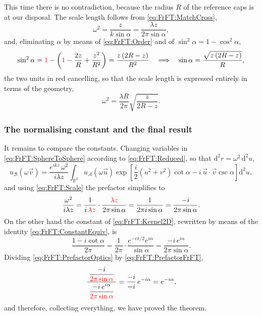 			This time there is no contradiction, because the radius $R$ of the reference caps is at our disposal. The scale length follows from \eqref{eq:FrFT:MatchCross},
			\begin{equation}\label{eq:FrFT:Scale}
				\omega^{2} = \frac{z}{k\sin\alpha} = \frac{\lambda z}{2\pi\sin\alpha},
			\end{equation}
			and, eliminating $\alpha$ by means of \eqref{eq:FrFT:Order} and of $\sin^{2}\alpha = 1-\cos^{2}\alpha$,
			\begin{equation*}
				\sin^{2}\alpha = {\color{red}1} - \left({\color{red}1} - \frac{2z}{R} + \frac{z^{2}}{R^{2}}\right) = \frac{z\left(2R-z\right)}{R^{2}} \quad\Longrightarrow\quad \sin\alpha = \frac{\sqrt{z\left(2R-z\right)}}{R},
			\end{equation*}
			the two units in red cancelling, so that the scale length is expressed entirely in terms of the geometry,
			\begin{equation}\label{eq:FrFT:ScaleExplicit}
				\omega^{2} = \frac{\lambda R}{2\pi}\sqrt{\frac{z}{2R-z}}.
			\end{equation}

		\subsubsection{The normalising constant and the final result}

			It remains to compare the constants. Changing variables in \eqref{eq:FrFT:SphereToSphere} according to \eqref{eq:FrFT:Reduced}, so that $\mathrm{d}^{2}r = \omega^{2}\,\mathrm{d}^{2}u$,
			\begin{equation}\label{eq:FrFT:Reduced2}
				u_{\mathcal{B}}(\omega\vec{v}) = \frac{e^{ikz}\,\omega^{2}}{i\lambda z}\int_{\mathbb{R}^{2}} u_{\mathcal{A}}(\omega\vec{u})\exp\left[\frac{i}{2}\left(u^{2}+v^{2}\right)\cot\alpha - i\,\vec{u}\cdot\vec{v}\csc\alpha\right]\mathrm{d}^{2}u,
			\end{equation}
			and using \eqref{eq:FrFT:Scale} the prefactor simplifies to
			\begin{equation}\label{eq:FrFT:PrefactorOptics}
				\frac{\omega^{2}}{i\lambda z} = \frac{1}{i\,{\color{red}\lambda z}}\cdot\frac{{\color{red}\lambda z}}{2\pi\sin\alpha} = \frac{1}{2\pi i\sin\alpha} = \frac{-i}{2\pi\sin\alpha}.
			\end{equation}
			On the other hand the constant of \eqref{eq:FrFT:Kernel2D}, rewritten by means of the identity \eqref{eq:FrFT:ConstantEquiv}, is
			\begin{equation}\label{eq:FrFT:PrefactorFrFT}
				\frac{1-i\cot\alpha}{2\pi} = \frac{1}{2\pi}\cdot\frac{e^{-i\pi/2}e^{i\alpha}}{\sin\alpha} = \frac{-i\,e^{i\alpha}}{2\pi\sin\alpha}.
			\end{equation}
			Dividing \eqref{eq:FrFT:PrefactorOptics} by \eqref{eq:FrFT:PrefactorFrFT},
			\begin{equation*}
				\frac{\;\dfrac{-i}{{\color{red}2\pi\sin\alpha}}\;}{\dfrac{-i\,e^{i\alpha}}{{\color{red}2\pi\sin\alpha}}} = \frac{-i}{-i}\,e^{-i\alpha} = e^{-i\alpha},
			\end{equation*}
			and therefore, collecting everything, we have proved the theorem.

